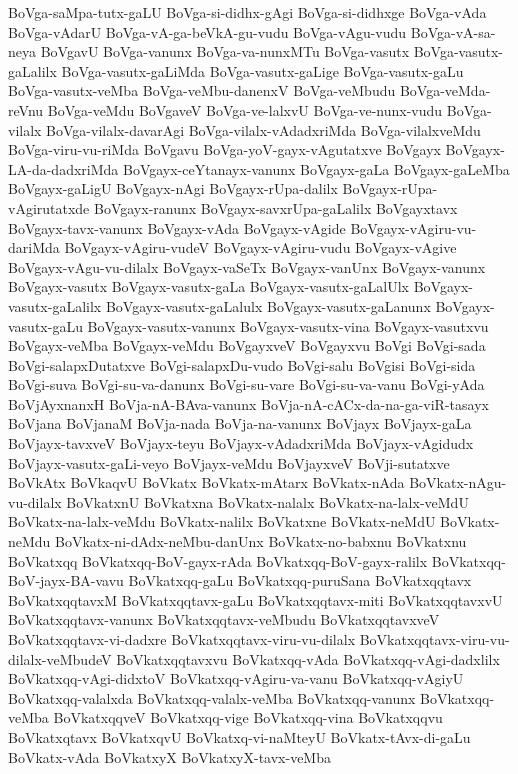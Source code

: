 {BoVga-saMpa-tutx-gaLU
BoVga-si-didhx-gAgi
BoVga-si-didhxge
BoVga-vAda
BoVga-vAdarU
BoVga-vA-ga-beVkA-gu-vudu
BoVga-vAgu-vudu
BoVga-vA-sa-neya
BoVgavU
BoVga-vanunx
BoVga-va-nunxMTu
BoVga-vasutx
BoVga-vasutx-gaLalilx
BoVga-vasutx-gaLiMda
BoVga-vasutx-gaLige
BoVga-vasutx-gaLu
BoVga-vasutx-veMba
BoVga-veMbu-danenxV
BoVga-veMbudu
BoVga-veMda-reVnu
BoVga-veMdu
BoVgaveV
BoVga-ve-lalxvU
BoVga-ve-nunx-vudu
BoVga-vilalx
BoVga-vilalx-davarAgi
BoVga-vilalx-vAdadxriMda
BoVga-vilalxveMdu
BoVga-viru-vu-riMda
BoVgavu
BoVga-yoV-gayx-vAgutatxve
BoVgayx
BoVgayx-LA-da-dadxriMda
BoVgayx-ceYtanayx-vanunx
BoVgayx-gaLa
BoVgayx-gaLeMba
BoVgayx-gaLigU
BoVgayx-nAgi
BoVgayx-rUpa-dalilx
BoVgayx-rUpa-vAgirutatxde
BoVgayx-ranunx
BoVgayx-savxrUpa-gaLalilx
BoVgayxtavx
BoVgayx-tavx-vanunx
BoVgayx-vAda
BoVgayx-vAgide
BoVgayx-vAgiru-vu-dariMda
BoVgayx-vAgiru-vudeV
BoVgayx-vAgiru-vudu
BoVgayx-vAgive
BoVgayx-vAgu-vu-dilalx
BoVgayx-vaSeTx
BoVgayx-vanUnx
BoVgayx-vanunx
BoVgayx-vasutx
BoVgayx-vasutx-gaLa
BoVgayx-vasutx-gaLalUlx
BoVgayx-vasutx-gaLalilx
BoVgayx-vasutx-gaLalulx
BoVgayx-vasutx-gaLanunx
BoVgayx-vasutx-gaLu
BoVgayx-vasutx-vanunx
BoVgayx-vasutx-vina
BoVgayx-vasutxvu
BoVgayx-veMba
BoVgayx-veMdu
BoVgayxveV
BoVgayxvu
BoVgi
BoVgi-sada
BoVgi-salapxDutatxve
BoVgi-salapxDu-vudo
BoVgi-salu
BoVgisi
BoVgi-sida
BoVgi-suva
BoVgi-su-va-danunx
BoVgi-su-vare
BoVgi-su-va-vanu
BoVgi-yAda
BoVjAyxnanxH
BoVja-nA-BAva-vanunx
BoVja-nA-cACx-da-na-ga-viR-tasayx
BoVjana
BoVjanaM
BoVja-nada
BoVja-na-vanunx
BoVjayx
BoVjayx-gaLa
BoVjayx-tavxveV
BoVjayx-teyu
BoVjayx-vAdadxriMda
BoVjayx-vAgidudx
BoVjayx-vasutx-gaLi-veyo
BoVjayx-veMdu
BoVjayxveV
BoVji-sutatxve
BoVkAtx
BoVkaqvU
BoVkatx
BoVkatx-mAtarx
BoVkatx-nAda
BoVkatx-nAgu-vu-dilalx
BoVkatxnU
BoVkatxna
BoVkatx-nalalx
BoVkatx-na-lalx-veMdU
BoVkatx-na-lalx-veMdu
BoVkatx-nalilx
BoVkatxne
BoVkatx-neMdU
BoVkatx-neMdu
BoVkatx-ni-dAdx-neMbu-danUnx
BoVkatx-no-babxnu
BoVkatxnu
BoVkatxqq
BoVkatxqq-BoV-gayx-rAda
BoVkatxqq-BoV-gayx-ralilx
BoVkatxqq-BoV-jayx-BA-vavu
BoVkatxqq-gaLu
BoVkatxqq-puruSana
BoVkatxqqtavx
BoVkatxqqtavxM
BoVkatxqqtavx-gaLu
BoVkatxqqtavx-miti
BoVkatxqqtavxvU
BoVkatxqqtavx-vanunx
BoVkatxqqtavx-veMbudu
BoVkatxqqtavxveV
BoVkatxqqtavx-vi-dadxre
BoVkatxqqtavx-viru-vu-dilalx
BoVkatxqqtavx-viru-vu-dilalx-veMbudeV
BoVkatxqqtavxvu
BoVkatxqq-vAda
BoVkatxqq-vAgi-dadxlilx
BoVkatxqq-vAgi-didxtoV
BoVkatxqq-vAgiru-va-vanu
BoVkatxqq-vAgiyU
BoVkatxqq-valalxda
BoVkatxqq-valalx-veMba
BoVkatxqq-vanunx
BoVkatxqq-veMba
BoVkatxqqveV
BoVkatxqq-vige
BoVkatxqq-vina
BoVkatxqqvu
BoVkatxqtavx
BoVkatxqvU
BoVkatxq-vi-naMteyU
BoVkatx-tAvx-di-gaLu
BoVkatx-vAda
BoVkatxyX
BoVkatxyX-tavx-veMba
}
